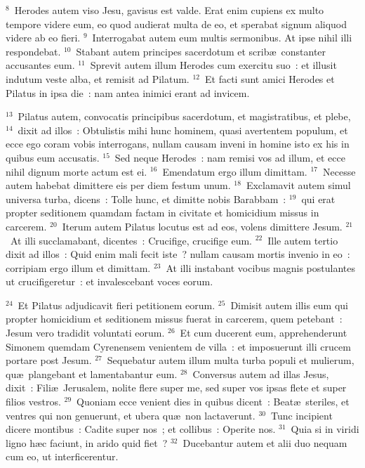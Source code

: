 ${}^{8}$~Herodes autem viso Jesu, gavisus est valde. Erat enim cupiens ex multo tempore videre eum, eo quod audierat multa de eo, et sperabat signum aliquod videre ab eo fieri.
${}^{9}$~Interrogabat autem eum multis sermonibus. At ipse nihil illi respondebat.
${}^{10}$~Stabant autem principes sacerdotum et scrib\ae\ constanter accusantes eum.
${}^{11}$~Sprevit autem illum Herodes cum exercitu suo~: et illusit indutum veste alba, et remisit ad Pilatum.
${}^{12}$~Et facti sunt amici Herodes et Pilatus in ipsa die~: nam antea inimici erant ad invicem.


${}^{13}$~Pilatus autem, convocatis principibus sacerdotum, et magistratibus, et plebe,
${}^{14}$~dixit ad illos~: Obtulistis mihi hunc hominem, quasi avertentem populum, et ecce ego coram vobis interrogans, nullam causam inveni in homine isto ex his in quibus eum accusatis.
${}^{15}$~Sed neque Herodes~: nam remisi vos ad illum, et ecce nihil dignum morte actum est ei.
${}^{16}$~Emendatum ergo illum dimittam.
${}^{17}$~Necesse autem habebat dimittere eis per diem festum unum.
${}^{18}$~Exclamavit autem simul universa turba, dicens~: Tolle hunc, et dimitte nobis Barabbam~:
${}^{19}$~qui erat propter seditionem quamdam factam in civitate et homicidium missus in carcerem.
${}^{20}$~Iterum autem Pilatus locutus est ad eos, volens dimittere Jesum.
${}^{21}$~At illi succlamabant, dicentes~: Crucifige, crucifige eum.
${}^{22}$~Ille autem tertio dixit ad illos~: Quid enim mali fecit iste~? nullam causam mortis invenio in eo~: corripiam ergo illum et dimittam.
${}^{23}$~At illi instabant vocibus magnis postulantes ut crucifigeretur~: et invalescebant voces eorum.


${}^{24}$~Et Pilatus adjudicavit fieri petitionem eorum.
${}^{25}$~Dimisit autem illis eum qui propter homicidium et seditionem missus fuerat in carcerem, quem petebant~: Jesum vero tradidit voluntati eorum.
${}^{26}$~Et cum ducerent eum, apprehenderunt Simonem quemdam Cyrenensem venientem de villa~: et imposuerunt illi crucem portare post Jesum.
${}^{27}$~Sequebatur autem illum multa turba populi et mulierum, qu\ae\ plangebant et lamentabantur eum.
${}^{28}$~Conversus autem ad illas Jesus, dixit~: Fili\ae\ Jerusalem, nolite flere super me, sed super vos ipsas flete et super filios vestros.
${}^{29}$~Quoniam ecce venient dies in quibus dicent~: Beat\ae\ steriles, et ventres qui non genuerunt, et ubera qu\ae\ non lactaverunt.
${}^{30}$~Tunc incipient dicere montibus~: Cadite super nos~; et collibus~: Operite nos.
${}^{31}$~Quia si in viridi ligno h\ae c faciunt, in arido quid fiet~?
${}^{32}$~Ducebantur autem et alii duo nequam cum eo, ut interficerentur.


